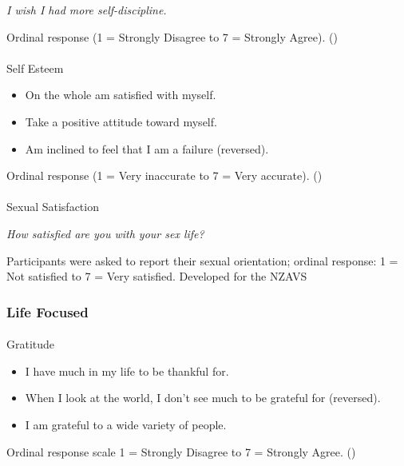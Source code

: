 \documentclass[
  single column]{article}
\makeatletter
\let\oldparagraph\paragraph
\renewcommand{\paragraph}{
    \@ifstar
      \xxxParagraphStar
      \xxxParagraphNoStar
  }
\newcommand{\xxxParagraphStar}[1]{\oldparagraph*{#1}\mbox{}}
\newcommand{\xxxParagraphNoStar}[1]{\oldparagraph{#1}\mbox{}}
\providecommand{\tightlist}{%
  \setlength{\itemsep}{0pt}\setlength{\parskip}{0pt}}\usepackage{longtable,booktabs,array}
\makeatother
\begin{document}
\emph{I wish I had more self-discipline.}

Ordinal response (1 = Strongly Disagree to 7 = Strongly Agree).
()

\paragraph{Self Esteem}\label{self-esteem}

\begin{itemize}
\tightlist
\item
  On the whole am satisfied with myself.
\item
  Take a positive attitude toward myself.
\item
  Am inclined to feel that I am a failure (reversed).
\end{itemize}

Ordinal response (1 = Very inaccurate to 7 = Very accurate).
()

\paragraph{Sexual Satisfaction}\label{sexual-satisfaction-1}

\emph{How satisfied are you with your sex life?}

Participants were asked to report their sexual orientation; ordinal
response: 1 = Not satisfied to 7 = Very satisfied. Developed for the
NZAVS

\subsubsection{Life Focused}\label{life-focused}

\paragraph{Gratitude}\label{gratitude-1}

\begin{itemize}
\tightlist
\item
  I have much in my life to be thankful for.
\item
  When I look at the world, I don't see much to be grateful for
  (reversed).
\item
  I am grateful to a wide variety of people.
\end{itemize}

Ordinal response scale 1 = Strongly Disagree to 7 = Strongly Agree.
()
\end{document}
